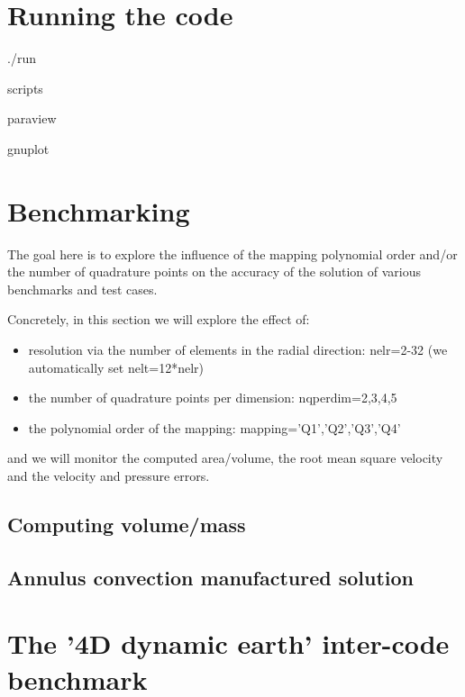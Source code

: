 \documentclass[a4paper,12pt]{article}
\newcommand{\python}{\color{teal} \sffamily }
\begin{document}
\newpage
\section{Running the code}

./run

scripts

paraview

gnuplot


\newpage
\section{Benchmarking}



The goal here is to explore the influence of the mapping polynomial order and/or
the number of quadrature points on the accuracy of the solution of various benchmarks and test cases.

Concretely, in this section we will explore the effect of:
\begin{itemize}
\item resolution via the number of elements in the radial direction: {\python nelr=2-32} (we automatically set {\python nelt=12*nelr})
\item the number of quadrature points per dimension: {\python nqperdim=2,3,4,5}
\item the polynomial order of the mapping: {\python mapping='Q1','Q2','Q3','Q4'}
\end{itemize}
and we will monitor the computed area/volume, the root mean square velocity and the velocity and pressure errors.

\subsection{Computing volume/mass}


\subsection{Annulus convection manufactured solution}




\section{The '4D dynamic earth' inter-code benchmark}
\end{document}
